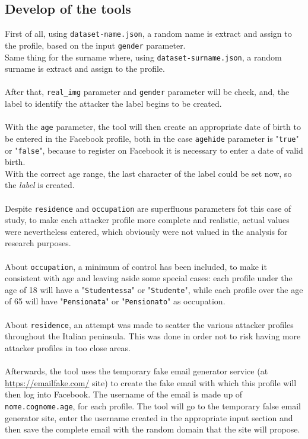\subsection{Develop of the tools}
First of all, using \texttt{dataset-name.json}, a random name is extract and assign to the profile, based on the input \texttt{gender} parameter.
\\Same thing for the surname where, using \texttt{dataset-surname.json}, a random surname is extract and assign to the profile.
\\\\After that, \texttt{real\_img} parameter and \texttt{gender} parameter will be check, and, the label to identify the attacker the label begins to be created. 
\\\\With the \texttt{age} parameter, the tool will then create an appropriate date of birth to be entered in the Facebook profile, both in the case \texttt{agehide} parameter is "\texttt{true}" or "\texttt{false}", because to register on Facebook it is necessary to enter a date of valid birth. \\With the correct age range, the last character of the label could be set now, so the \textit{label} is created.
\\\\Despite \texttt{residence} and \texttt{occupation} are superfluous parameters fot this case of study, to make each attacker profile more complete and realistic, actual values were nevertheless entered, which obviously were not valued in the analysis for research purposes.
\\\\About \texttt{occupation}, a minimum of control has been included, to make it consistent with age and leaving aside some special cases: each profile under the age of 18 will have a "\texttt{Studentessa}" or "\texttt{Studente}", while each profile over the age of 65 will have "\texttt{Pensionata}" or "\texttt{Pensionato}" as occupation.
\\\\About \texttt{residence}, an attempt was made to scatter the various attacker profiles throughout the Italian peninsula. This was done in order not to risk having more attacker profiles in too close areas.
\\\\Afterwards, the tool uses the temporary fake email generator service (at \url{https://emailfake.com/} site) to create the fake email with which this profile will then log into Facebook. The username of the email is made up of \texttt{nome.cognome.age}, for each profile. The tool will go to the temporary false email generator site, enter the username created in the appropriate input section and then save the complete email with the random domain that the site will propose.
